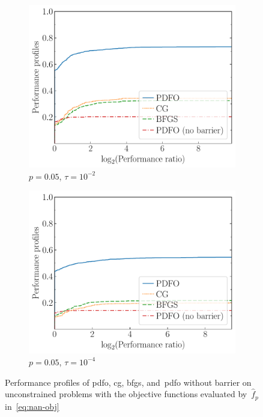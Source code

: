 \documentclass[
    smallextended,  %
    final,          %
]{svjour3}
\newcommand{\obj}{f}
\begin{document}
\begin{figure}[!htb]
\begin{subfigure}{.48\textwidth}
        \centering
        \includegraphics[width=\textwidth]{perf-nan-bfgs_cg_pdfo-50-0.05-2}
        \caption{$p = 0.05$, $\tau = 10^{-2}$}
    \end{subfigure}
    \hfill
    \begin{subfigure}{.48\textwidth}
        \centering
        \includegraphics[width=\textwidth]{perf-nan-bfgs_cg_pdfo-50-0.05-4}
        \caption{$p = 0.05$, $\tau = 10^{-4}$}
    \end{subfigure}
    \caption{Performance profiles of \gls{pdfo}, \gls{cg}, \gls{bfgs}, and~\gls{pdfo} without barrier on unconstrained problems with the objective functions evaluated by~$\hat{\obj}_p$ in~\eqref{eq:nan-obj}}
    \label{fig:nan}
\end{figure}
\end{document}
